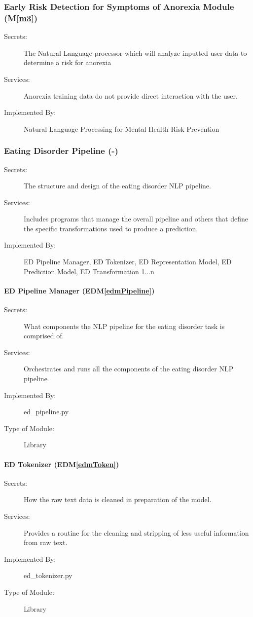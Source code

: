 \documentclass[12pt, titlepage]{article}
\newcommand{\mref}[1]{M\ref{#1}}
\newcommand{\edmref}[1]{EDM\ref{#1}}
\begin{document}
\subsubsection{Early Risk Detection for Symptoms of Anorexia Module (\mref{m3})}
\begin{description}
\item[Secrets:] The Natural Language processor which will analyze inputted user data to determine a risk for anorexia
\item[Services:] Anorexia training data
  do not provide direct interaction with the user. 
\item[Implemented By:] Natural Language Processing for Mental Health Risk Prevention
\end{description}

\subsubsection{Eating Disorder Pipeline (-)}
\begin{description}
\item[Secrets:] The structure and design of the eating disorder NLP pipeline.
\item[Services:] Includes programs that manage the overall pipeline and others that define the specific transformations used to produce a prediction.
\item[Implemented By:] ED Pipeline Manager, ED Tokenizer, ED Representation Model, ED Prediction Model, ED Transformation 1...n
\end{description}

\paragraph{ED Pipeline Manager (\edmref{edmPipeline})}
\begin{description}
\item[Secrets:] What components the NLP pipeline for the eating disorder task is comprised of.
\item[Services:] Orchestrates and runs all the components of the eating disorder NLP pipeline.
\item[Implemented By:] ed\_pipeline.py
\item[Type of Module:] Library
\end{description}

\paragraph{ED Tokenizer (\edmref{edmToken})}
\begin{description}
\item[Secrets:] How the raw text data is cleaned in preparation of the model.
\item[Services:] Provides a routine for the cleaning and stripping of less useful information from raw text.
\item[Implemented By:] ed\_tokenizer.py
\item[Type of Module:] Library
\end{description}
\end{document}
